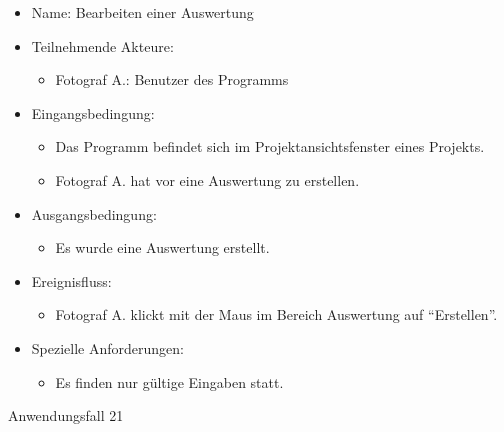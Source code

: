 	\begin{itemize}
		\item Name: Bearbeiten einer Auswertung
		\item Teilnehmende Akteure:
		\begin{itemize}
			\item	Fotograf A.: Benutzer des Programms		
		\end{itemize}
		\item Eingangsbedingung:
		\begin{itemize}
			\item	Das Programm befindet sich im Projektansichtsfenster eines Projekts.
			\item Fotograf A. hat vor eine Auswertung zu erstellen.
		\end{itemize}
		\item Ausgangsbedingung:
		\begin{itemize}
			\item	Es wurde eine Auswertung erstellt.	
		\end{itemize}
		\item Ereignisfluss:
		\begin{itemize}
			\item Fotograf A. klickt mit der Maus im Bereich Auswertung auf "`Erstellen"'.
		\end{itemize}
		\item Spezielle Anforderungen:
		\begin{itemize}
			\item	Es finden nur gültige Eingaben statt.
		\end{itemize}			
	\end{itemize}
	
	\begin{description}
		\item[Anwendungsfall 21]
	\end{description}
	
